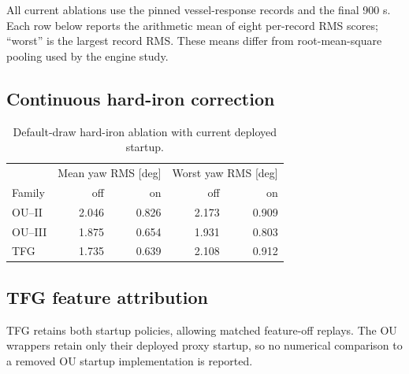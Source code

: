 All current ablations use the pinned vessel-response records and the
final 900 s. Each row below reports the arithmetic mean of eight per-record
RMS scores; ``worst'' is the largest record RMS. These means differ from
root-mean-square pooling used by the engine study.

\subsection{Continuous hard-iron correction}
\begin{table}[t]\centering
\caption{Default-draw hard-iron ablation with current deployed startup.}
\label{tab:startup-hardiron}\footnotesize
\begin{tabular}{@{}lrrrr@{}}\toprule
& \multicolumn{2}{c}{Mean yaw RMS [deg]} & \multicolumn{2}{c}{Worst yaw RMS [deg]} \\
Family & off & on & off & on \\
\midrule
OU--II & 2.046 & 0.826 & 2.173 & 0.909 \\
OU--III & 1.875 & 0.654 & 1.931 & 0.803 \\
TFG & 1.735 & 0.639 & 2.108 & 0.912 \\
\bottomrule\end{tabular}\end{table}

\subsection{TFG feature attribution}
TFG retains both startup policies, allowing matched feature-off replays.
The OU wrappers retain only their deployed proxy startup, so no numerical
comparison to a removed OU startup implementation is reported.
\begin{table}[t]\centering
\caption{TFG default-draw feature ablations. Bias is mean accelerometer-bias RMS.}
\label{tab:tfg-ablation}\footnotesize
{}\end{table}

